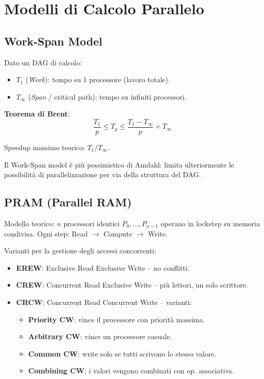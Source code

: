 \documentclass[11pt,a4paper]{article}
\theoremstyle{remark}
\begin{document}
\section{Modelli di Calcolo Parallelo}

\subsection{Work-Span Model}

Dato un DAG di calcolo:
\begin{itemize}
  \item $T_1$ (\emph{Work}): tempo su 1 processore (lavoro totale).
  \item $T_\infty$ (\emph{Span} / critical path): tempo su infiniti processori.
\end{itemize}

\textbf{Teorema di Brent}:
\begin{equation}
  \frac{T_1}{p} \leq T_p \leq \frac{T_1 - T_\infty}{p} + T_\infty
\end{equation}

Speedup massimo teorico: $T_1 / T_\infty$.

Il Work-Span model è più pessimistico di Amdahl: limita ulteriormente le possibilità di parallelizzazione per via della struttura del DAG.

\subsection{PRAM (Parallel RAM)}

Modello teorico: $n$ processori identici $P_0, \ldots, P_{n-1}$ operano in lockstep su memoria condivisa. Ogni step: Read $\to$ Compute $\to$ Write.

Varianti per la gestione degli accessi concorrenti:
\begin{itemize}
  \item \textbf{EREW}: Exclusive Read Exclusive Write -- no conflitti.
  \item \textbf{CREW}: Concurrent Read Exclusive Write -- più lettori, un solo scrittore.
  \item \textbf{CRCW}: Concurrent Read Concurrent Write -- varianti:
    \begin{itemize}
      \item \textbf{Priority CW}: vince il processore con priorità massima.
      \item \textbf{Arbitrary CW}: vince un processore casuale.
      \item \textbf{Common CW}: write solo se tutti scrivono lo stesso valore.
      \item \textbf{Combining CW}: i valori vengono combinati con op. associativa.
    \end{itemize}
\end{itemize}
\end{document}
